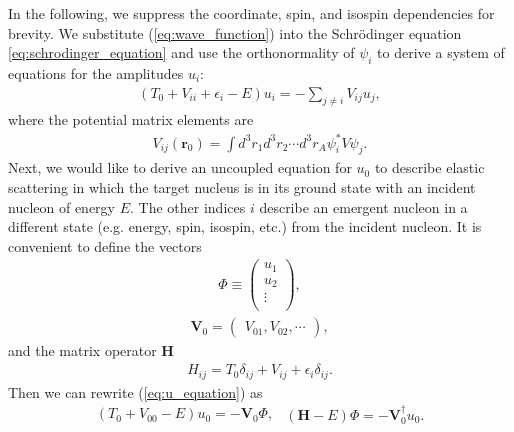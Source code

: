 \documentclass[preprintnumbers,floatfix,aps,prc,preprint,nofootinbib]{revtex4-1}
\begin{document}
In the following, we suppress the coordinate, spin, and isospin dependencies for brevity. We substitute (\ref{eq:wave_function}) into the Schr\"odinger equation \ref{eq:schrodinger_equation} and use the orthonormality of $\psi_i$ to derive a system of equations for the amplitudes $u_i$:
%
\begin{eqnarray}
	\label{eq:u_equation}
	(T_0 + V_{ii} + \epsilon_i - E) u_i = - \sum_{j \neq i} V_{ij} u_j,
\end{eqnarray}
%
where the potential matrix elements are
%
\begin{eqnarray}
	\label{eq:potential_matrix_elements}
	V_{ij}(\textbf{r}_0) = \int{d^3 r_1 d^3 r_2 \cdots d^3 r_A \psi_i^* V \psi_j}.
\end{eqnarray}
%
Next, we would like to derive an uncoupled equation for $u_0$ to describe elastic scattering in which the target nucleus is in its ground state with an incident nucleon of energy $E$. The other indices $i$ describe an emergent nucleon in a different state (e.g. energy, spin, isospin, etc.) from the incident nucleon. It is convenient to define the vectors
%
\begin{eqnarray}
	\label{eq:u_vector}
	\Phi \equiv
	\begin{pmatrix}
		u_1 \\
		u_2 \\
		\vdots \\
	\end{pmatrix}
	,
\end{eqnarray}
%
\begin{eqnarray}
	\label{eq:potential_vector}
	\textbf{V}_0 =
	\begin{pmatrix}
		V_{01}, V_{02}, \cdots
	\end{pmatrix}
	,
\end{eqnarray}
%
and the matrix operator $\textbf{H}$
%
\begin{eqnarray}
	\label{eq:hamiltonian_operator}
	H_{ij} = T_0 \delta_{ij} + V_{ij} + \epsilon_i \delta_{ij}.
\end{eqnarray}
%
Then we can rewrite (\ref{eq:u_equation}) as
%
\begin{subequations}
	\label{eq:u_vector_equation}
	\begin{eqnarray}
		\label{eq:u_vector_equation_a}
		(T_0 + V_{00} - E) u_0 = -\textbf{V}_0 \Phi,
	\end{eqnarray}
	\begin{eqnarray}
		\label{eq:u_vector_equation_b}
		(\textbf{H}-E) \Phi = -\textbf{V}_0^{\dagger} u_0.
	\end{eqnarray}
\end{subequations}
\end{document}
